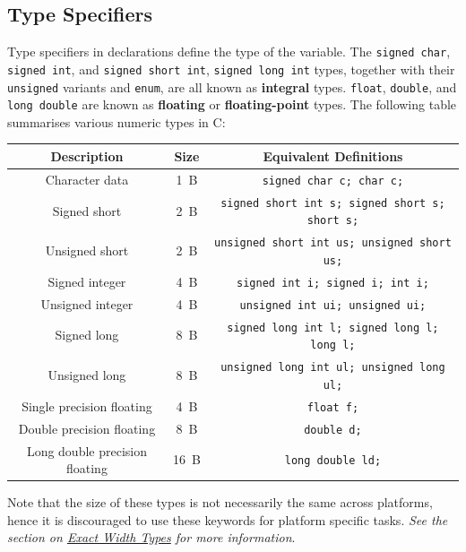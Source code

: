 \documentclass{report}
\begin{document}
\subsection{Type Specifiers}
Type specifiers in declarations define the type of the variable.
The \texttt{signed char}, \texttt{signed int}, and
\texttt{signed short int}, \texttt{signed long int} types, together with their \texttt{unsigned} variants
and \texttt{enum}, are all known as \textbf{integral} types.
\texttt{float}, \texttt{double}, and \texttt{long double} are known as \textbf{floating} or \textbf{floating-point} types.
The following table summarises various numeric types in C\@:
\begin{table}[H]
    \centering
    \begin{tabular}{c c c}
        \toprule
        \textbf{Description}           & \textbf{Size} & \textbf{Equivalent Definitions}                              \\
        \midrule
        Character data                 & \qty{1}{B}    & \texttt{signed char c; char c;}                       \\
        Signed short                   & \qty{2}{B}    & \texttt{signed short int s; signed short s; short s;} \\
        Unsigned short                 & \qty{2}{B}    & \texttt{unsigned short int us; unsigned short us;}    \\
        Signed integer                 & \qty{4}{B}    & \texttt{signed int i; signed i; int i;}               \\
        Unsigned integer               & \qty{4}{B}    & \texttt{unsigned int ui; unsigned ui;}                \\
        Signed long                    & \qty{8}{B}    & \texttt{signed long int l; signed long l; long l;}    \\
        Unsigned long                  & \qty{8}{B}    & \texttt{unsigned long int ul; unsigned long ul;}      \\
        Single precision floating      & \qty{4}{B}    & \texttt{float f;}                                     \\
        Double precision floating      & \qty{8}{B}    & \texttt{double d;}                                    \\
        Long double precision floating & \qty{16}{B}   & \texttt{long double ld;}                              \\
        \bottomrule
    \end{tabular}
\end{table}
Note that the size of these types is not necessarily the same across platforms, hence it is discouraged to use these keywords for
platform specific tasks. \emph{See the section on \hyperref[sec:exact_width_types]{Exact Width Types} for more information}.
\end{document}
